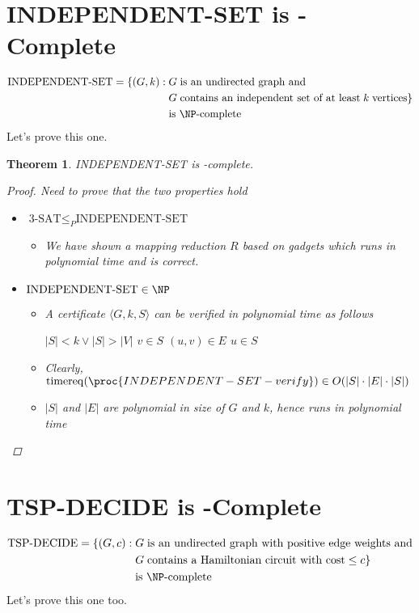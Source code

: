 \documentclass[a4paper]{report}
\newtheorem{theo}{Theorem}
\newcommand{\bookref}[3]{\marginpar{\faBook{}~#1\\Chapter #2\\Section #3}}
\theoremstyle{definition}
\DeclareMathOperator*{\treq}{timereq}
\begin{document}
\section{INDEPENDENT-SET is \NP-Complete}
\bookref{ER}{28}{28.6.4}
\vspace{-0.3cm}%
\begin{align*}
\text{INDEPENDENT-SET} = \{ (G, k) : &\; G \;\text{is an undirected graph and}\\ &\; G \;\text{contains an independent set of at least} \; k \; \text{vertices}\}\\ & \;\text{is \NP-complete}
\end{align*}
%
Let's prove this one.

\begin{theo}
INDEPENDENT-SET is \NP-complete.
\begin{proof}
Need to prove that the two properties hold
\begin{itemize}
\item {} $\text{3-SAT} \leq_P \text{INDEPENDENT-SET}$
\begin{itemize}
\item We have shown a mapping reduction $R$ based on gadgets which runs in polynomial time and is correct.
\end{itemize}
\item {} $\text{INDEPENDENT-SET} \in \NP$
\begin{itemize}
\item A certificate $\langle G, k, S \rangle$ can be verified in polynomial time as follows
\begin{codebox}
\li \If $|S| < k \vee |S| > |V|$ 
\li \Then \Return {}
\End
\li \For $v \in S$
  \li \Do \For $(u,v) \in E$ 
    \li \Do \If $u \in S$
      \li \Then \Return {}
    \End
  \End
\End
\li \Return {}
\end{codebox}
\item Clearly, $\treq(\proc{INDEPENDENT-SET-verify}) \in O(|S|\cdot|E|\cdot|S|)$
\item $|S|$ and $|E|$ are polynomial in size of $G$ and $k$, hence  runs in polynomial time
\end{itemize}
\end{itemize}
\end{proof}
\end{theo}

\section{TSP-DECIDE is \NP-Complete}
\bookref{ER}{28}{28.6.6}
\vspace{-0.3cm}%
\begin{align*}
\text{TSP-DECIDE} = \{(G, c) : & \;G \;\text{is an undirected graph with positive edge weights and}\\ &\; G \;\text{contains a Hamiltonian circuit with cost} \leq c\}\\ & \;\text{is \NP-complete}
\end{align*}
%
Let's prove this one too.
\end{document}

